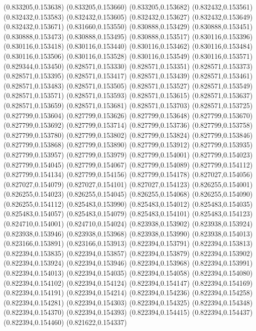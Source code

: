 (0.833205,0.153638)
(0.833205,0.153660)
(0.833205,0.153682)
(0.832432,0.153561)
(0.832432,0.153583)
(0.832432,0.153605)
(0.832432,0.153627)
(0.832432,0.153649)
(0.832432,0.153671)
(0.831660,0.153550)
(0.830888,0.153429)
(0.830888,0.153451)
(0.830888,0.153473)
(0.830888,0.153495)
(0.830888,0.153517)
(0.830116,0.153396)
(0.830116,0.153418)
(0.830116,0.153440)
(0.830116,0.153462)
(0.830116,0.153484)
(0.830116,0.153506)
(0.830116,0.153528)
(0.830116,0.153549)
(0.830116,0.153571)
(0.829344,0.153450)
(0.828571,0.153330)
(0.828571,0.153351)
(0.828571,0.153373)
(0.828571,0.153395)
(0.828571,0.153417)
(0.828571,0.153439)
(0.828571,0.153461)
(0.828571,0.153483)
(0.828571,0.153505)
(0.828571,0.153527)
(0.828571,0.153549)
(0.828571,0.153571)
(0.828571,0.153593)
(0.828571,0.153615)
(0.828571,0.153637)
(0.828571,0.153659)
(0.828571,0.153681)
(0.828571,0.153703)
(0.828571,0.153725)
(0.827799,0.153604)
(0.827799,0.153626)
(0.827799,0.153648)
(0.827799,0.153670)
(0.827799,0.153692)
(0.827799,0.153714)
(0.827799,0.153736)
(0.827799,0.153758)
(0.827799,0.153780)
(0.827799,0.153802)
(0.827799,0.153824)
(0.827799,0.153846)
(0.827799,0.153868)
(0.827799,0.153890)
(0.827799,0.153912)
(0.827799,0.153935)
(0.827799,0.153957)
(0.827799,0.153979)
(0.827799,0.154001)
(0.827799,0.154023)
(0.827799,0.154045)
(0.827799,0.154067)
(0.827799,0.154089)
(0.827799,0.154112)
(0.827799,0.154134)
(0.827799,0.154156)
(0.827799,0.154178)
(0.827027,0.154056)
(0.827027,0.154079)
(0.827027,0.154101)
(0.827027,0.154123)
(0.826255,0.154001)
(0.826255,0.154023)
(0.826255,0.154045)
(0.826255,0.154068)
(0.826255,0.154090)
(0.826255,0.154112)
(0.825483,0.153990)
(0.825483,0.154012)
(0.825483,0.154035)
(0.825483,0.154057)
(0.825483,0.154079)
(0.825483,0.154101)
(0.825483,0.154123)
(0.824710,0.154001)
(0.824710,0.154024)
(0.823938,0.153902)
(0.823938,0.153924)
(0.823938,0.153946)
(0.823938,0.153968)
(0.823938,0.153990)
(0.823938,0.154013)
(0.823166,0.153891)
(0.823166,0.153913)
(0.822394,0.153791)
(0.822394,0.153813)
(0.822394,0.153835)
(0.822394,0.153857)
(0.822394,0.153879)
(0.822394,0.153902)
(0.822394,0.153924)
(0.822394,0.153946)
(0.822394,0.153968)
(0.822394,0.153991)
(0.822394,0.154013)
(0.822394,0.154035)
(0.822394,0.154058)
(0.822394,0.154080)
(0.822394,0.154102)
(0.822394,0.154124)
(0.822394,0.154147)
(0.822394,0.154169)
(0.822394,0.154191)
(0.822394,0.154214)
(0.822394,0.154236)
(0.822394,0.154258)
(0.822394,0.154281)
(0.822394,0.154303)
(0.822394,0.154325)
(0.822394,0.154348)
(0.822394,0.154370)
(0.822394,0.154393)
(0.822394,0.154415)
(0.822394,0.154437)
(0.822394,0.154460)
(0.821622,0.154337)
